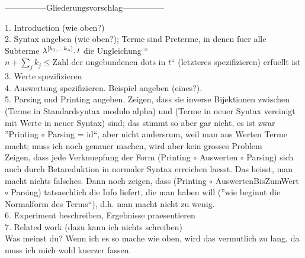 \documentclass[submission,copyright,creativecommons]{eptcs}
\begin{document}
%


\vspace{30pt}





\newpage 

---------------Gliederungsvorschlag---------------

\vspace{10pt}

1. Introduction (wie oben?) \\
2. Syntax angeben (wie oben?); Terme sind Preterme, in denen fuer alle Subterme $\lambda ^{[k_1, \ldots k_n]} . \, t$ die Ungleichung ``$n + \sum_{j} k_j \leq \mbox{Zahl der ungebundenen dots in $t$}$`` (letzteres spezifizieren) erfuellt ist \\
3. Werte spezifizieren \\
4. Auswertung spezifizieren. Beispiel angeben (eines?). \\
5. Parsing und Printing angeben. Zeigen, dass sie inverse Bijektionen zwischen (Terme in Standardsyntax modulo alpha) und (Terme in neuer Syntax vereinigt mit Werte in neuer Syntax) sind; das stimmt so aber gar nicht, es ist zwar ''Printing $\circ$ Parsing = id``, aber nicht andersrum, weil man aus Werten Terme macht; muss ich noch genauer machen, wird aber kein grosses Problem \\
Zeigen, dass jede Verknuepfung der Form (Printing $\circ$ Auswerten $\circ$ Parsing) sich auch durch Betareduktion in normaler Syntax erreichen laesst. Das heisst, man macht nichts falsches. Dann noch zeigen, dass (Printing $\circ$ AuswertenBisZumWert $\circ$ Parsing) tatsaechlich die Info liefert, die man haben will (''wie beginnt die Normalform des Terms``), d.h. man macht nicht zu wenig. \\
6. Experiment beschreiben, Ergebnisse praesentieren \\
7. Related work (dazu kann ich nichts schreiben) \\

Was meinst du? Wenn ich es so mache wie oben, wird das vermutlich zu lang, da muss ich mich wohl kuerzer fassen.
\end{document}
